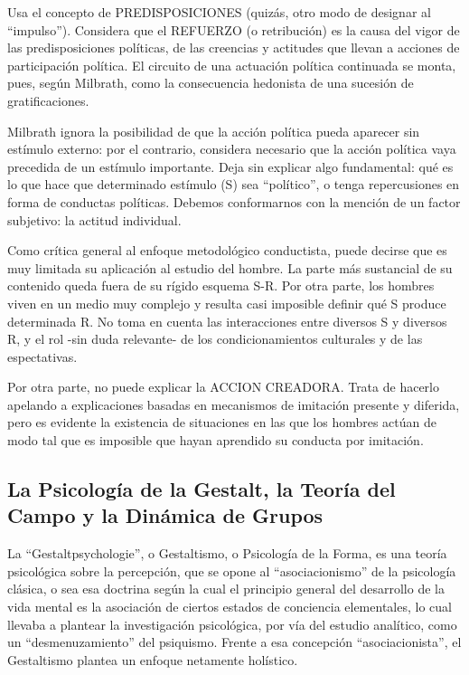 \documentclass[
]{book}
\begin{document}
Usa el concepto de PREDISPOSICIONES (quizás, otro modo de designar al ``impulso''). Considera que el REFUERZO (o retribución) es la causa del vigor de las predisposiciones políticas, de las creencias y actitudes que llevan a acciones de participación política. El circuito de una actuación política continuada se monta, pues, según Milbrath, como la consecuencia hedonista de una sucesión de gratificaciones.

Milbrath ignora la posibilidad de que la acción política pueda aparecer sin estímulo externo: por el contrario, considera necesario que la acción política vaya precedida de un estímulo importante. Deja sin explicar algo fundamental: qué es lo que hace que determinado estímulo (S) sea ``político'', o tenga repercusiones en forma de conductas políticas. Debemos conformarnos con la mención de un factor subjetivo: la actitud individual.

Como crítica general al enfoque metodológico conductista, puede decirse que es muy limitada su aplicación al estudio del hombre. La parte más sustancial de su contenido queda fuera de su rígido esquema S-R. Por otra parte, los hombres viven en un medio muy complejo y resulta casi imposible definir qué S produce determinada R. No toma en cuenta las interacciones entre diversos S y diversos R, y el rol -sin duda relevante- de los condicionamientos culturales y de las espectativas.

Por otra parte, no puede explicar la ACCION CREADORA. Trata de hacerlo apelando a explicaciones basadas en mecanismos de imitación presente y diferida, pero es evidente la existencia de situaciones en las que los hombres actúan de modo tal que es imposible que hayan aprendido su conducta por imitación.

\hypertarget{la-psicologuxeda-de-la-gestalt-la-teoruxeda-del-campo-y-la-dinuxe1mica-de-grupos}{%
\subsection*{La Psicología de la Gestalt, la Teoría del Campo y la Dinámica de Grupos}\label{la-psicologuxeda-de-la-gestalt-la-teoruxeda-del-campo-y-la-dinuxe1mica-de-grupos}}

La ``Gestaltpsychologie'', o Gestaltismo, o Psicología de la Forma, es una teoría psicológica sobre la percepción, que se opone al ``asociacionismo'' de la psicología clásica, o sea esa doctrina según la cual el principio general del desarrollo de la vida mental es la asociación de ciertos estados de conciencia elementales, lo cual llevaba a plantear la investigación psicológica, por vía del estudio analítico, como un ``desmenuzamiento'' del psiquismo. Frente a esa concepción ``asociacionista'', el Gestaltismo plantea un enfoque netamente holístico.
\end{document}
